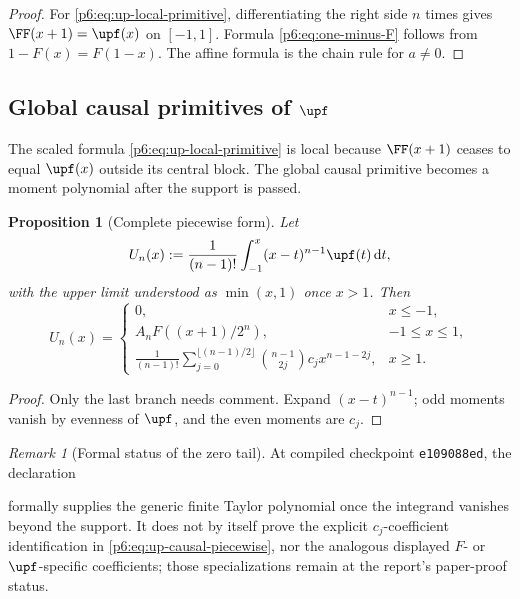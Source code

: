 \documentclass[11pt,oneside]{article}
\newtheorem{proposition}[theorem]{Proposition}
\theoremstyle{definition}
\theoremstyle{remark}
\newtheorem{remark}[theorem]{Remark}
\newcommand{\dd}{\,\mathrm d}
\newcommand{\1}{\mathbf 1}
\begin{document}
\begin{proof}
For \eqref{p6:eq:up-local-primitive}, differentiating the right side \(n\) times gives
\(\FF(x+1)=\upf(x)\) on \([-1,1]\).  Formula \eqref{p6:eq:one-minus-F} follows from
\(1-F(x)=F(1-x)\).  The affine formula is the chain rule for \(a\ne0\).
\end{proof}

\subsection{Global causal primitives of \(\upf\)}

The scaled formula \eqref{p6:eq:up-local-primitive} is local because \(\FF(x+1)\) ceases
to equal \(\upf(x)\) outside its central block.  The global causal primitive becomes a
moment polynomial after the support is passed.

\begin{proposition}[Complete piecewise form]
\label{p6:prop:up-causal}
Let
\[
 U_n(x):=\frac1{(n-1)!}\int_{-1}^{x}(x-t)^{n-1}\upf(t)\dd t,
\]
with the upper limit understood as \(\min(x,1)\) once \(x>1\).  Then
\begin{equation}
 U_n(x)=
 \begin{cases}
  0,&x\le-1,\\[1mm]
  A_nF((x+1)/2^n),&-1\le x\le1,\\[1mm]
  \displaystyle
  \frac1{(n-1)!}
  \sum_{j=0}^{\lfloor(n-1)/2\rfloor}
    \binom{n-1}{2j}c_jx^{n-1-2j},&x\ge1.
 \end{cases}                                               \label{p6:eq:up-causal-piecewise}
\end{equation}
\end{proposition}

\begin{proof}
Only the last branch needs comment.  Expand \((x-t)^{n-1}\); odd moments vanish by
evenness of \(\upf\), and the even moments are \(c_j\).
\end{proof}

\begin{remark}[Formal status of the zero tail]
At compiled checkpoint \texttt{e109088ed}, the declaration
\begin{center}
\end{center}
formally supplies the generic finite Taylor polynomial once the integrand vanishes beyond
the support.  It does not by itself prove the explicit \(c_j\)-coefficient identification in
\eqref{p6:eq:up-causal-piecewise}, nor the analogous displayed \(F\)- or
\(\upf\)-specific coefficients; those specializations remain at the report's paper-proof
status.
\end{remark}
\end{document}
